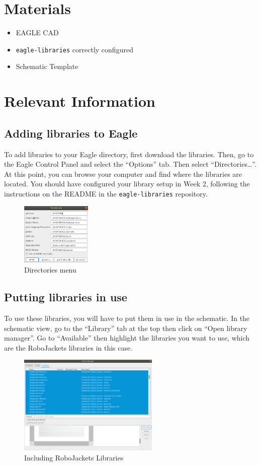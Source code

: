 \documentclass{article}
\begin{document}
\section{Materials}
\begin{itemize}
	\item EAGLE CAD
	\item \texttt{eagle-libraries} correctly configured
	\item Schematic Template
\end{itemize}

\section{Relevant Information}
\subsection{Adding libraries to Eagle}
To add libraries to your Eagle directory, first download the libraries. Then, go to the Eagle Control Panel and select the “Options” tab. Then select “Directories…”. At this point, you can browse your computer and find where the libraries are located. You should have configured your library setup in Week 2, following the instructions on the README in the \texttt{eagle-libraries} repository. 
\begin{figure}[ht]
	\center
	\includegraphics[width=0.3\textwidth, keepaspectratio]{images/directories.png}
	\caption{Directories menu}
	\label{fig:directories}
\end{figure}
\subsection{Putting libraries in use}
To use these libraries, you will have to put them in use in the schematic. In the schematic view, go to the “Library” tab at the top then click on “Open library manager”. Go to “Available” then highlight the libraries you want to use, which are the RoboJackets libraries in this case. 
\begin{figure}[ht]
	\center
	\includegraphics[width=0.6\textwidth, keepaspectratio]{images/manager.png}
	\caption{Including RoboJackets Libraries}
	\label{fig:addlib}
\end{figure}
\end{document}
